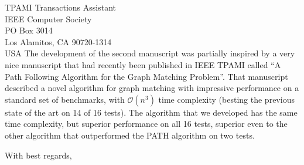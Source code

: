 \documentclass{letter}
\begin{document}
\begin{letter}{TPAMI Transactions Assistant \\ IEEE Computer Society \\ PO Box 3014 \\ Los Alamitos, CA  90720-1314\\ USA}
The development of the second manuscript was partially inspired by a very nice manuscript that had recently been published in IEEE TPAMI called ``A Path Following Algorithm for the Graph Matching Problem''.  That manuscript described a novel algorithm for graph matching with impressive performance on a standard set of benchmarks, with $\mathcal{O}(n^3)$ time complexity (besting the previous state of the art on 14 of 16 tests).   The algorithm that we developed has the same time complexity, but superior performance on all 16 tests, superior even to the other algorithm that outperformed the PATH algorithm on two tests.  



\closing{With best regards,}

\end{letter}
\end{document}
